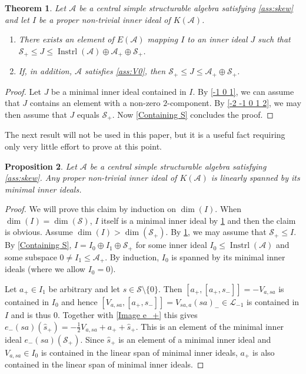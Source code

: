 \documentclass[oneside,a4paper]{amsart} %
\newtheorem{theorem}{Theorem}[section]
\newtheorem{proposition}[theorem]{Proposition}
\theoremstyle{definition}
\DeclareMathOperator{\Inst}{Instrl}
\newcommand{\A}{\mathcal{A}}
\renewcommand{\SS}{\mathcal{S}}
\newcommand{\LL}{\mathcal{L}}
\numberwithin{equation}{section}
\begin{document}
\begin{theorem}
\label{Reducing to S_+}
    Let $\A$ be a central simple structurable algebra satisfying \cref{ass:skew}
    and let $I$ be a proper non-trivial inner ideal of $K(\A)$.
    \begin{enumerate}
        \item There exists an element of $E(\A)$ mapping $I$ to an inner ideal $J$ such that $\SS_+ \leq J \leq \Inst(\A)\oplus \A_+\oplus \SS_+$.
        \item If, in addition, $\A$ satisfies \cref{ass:V0}, then $\SS_+ \leq J \leq \A_+ \oplus \SS_+$.
    \end{enumerate}
\end{theorem}
\begin{proof}
	Let $J$ be a minimal inner ideal contained in $I$.
	By \cref{-1 0 1}, we can assume that $J$ contains an element with a non-zero $2$-component. 
	By \cref{-2 -1 0 1 2}, we may then assume that $J$ equals $\SS_+$. 
	Now \cref{Containing S} concludes the proof.
\end{proof}

The next result will not be used in this paper, but it is a useful fact requiring only very little effort to prove at this point.
\begin{proposition}
\label{Inner spanned by min}
	Let $\A$ be a central simple structurable algebra satisfying \cref{ass:skew}.
	Any proper non-trivial inner ideal of $K(\A)$ is linearly spanned by its minimal inner ideals.
\end{proposition}
\begin{proof}
	We will prove this claim by induction on $\dim (I)$.
	When $\dim(I)=\dim (\SS)$, $I$ itself is a minimal inner ideal by \cref{Reducing to S_+} and then the claim is obvious.
	Assume $\dim(I)>\dim(\SS_+)$.
	By \cref{Reducing to S_+}, we may assume that $\SS_+\leq I$.
	By \cref{Containing S}, $I=I_0\oplus I_1\oplus \SS_+$ for some inner ideal $I_0\leq \Inst(\A)$ and some subspace $0\neq I_1\leq \A_+$.
	By induction, $I_0$ is spanned by its minimal inner ideals (where we allow $I_0 = 0$).
	
	Let $a_+\in I_1$ be arbitrary and let $s \in \SS \setminus \{ 0 \}$.
	Then $[a_+,[a_+,s_-]]=-V_{a,sa}$ is contained in $I_0$ and hence $[V_{a,sa},[a_+,s_-]]=V_{sa,a}(sa)_-\in\LL_{-1}$ is contained in $I$ and is thus $0$.
	Together with \cref{Image e_+} this gives $e_-(sa)(\hat s_+) = -\frac{1}{2}V_{a,sa} + a_+ + \hat s_+$.
	This is an element of the minimal inner ideal $e_-(sa)(\SS_+)$.
	Since $\hat s_+$ is an element of a minimal inner ideal and $V_{a,sa}\in I_0$ is contained in the linear span of minimal inner ideals, $a_+$ is also contained in the linear span of minimal inner ideals. 
\end{proof}
\end{document}
